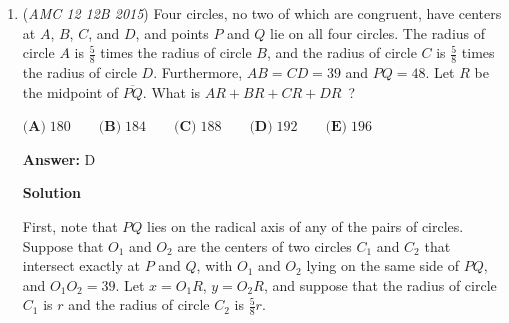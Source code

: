 \begin{enumerate}
 Divide both sides by $2abc$, we have: 
 \[\frac{1}{a}+\frac{1}{b}+\frac{1}{c}=\frac{1}{2}.\]First consider the bound of the variable $a$. Since $\frac{1}{a}<\frac{1}{a}+\frac{1}{b}+\frac{1}{c}=\frac{1}{2},$ we have $a>2$, or $a\ge 3$.

 Also note that $c\ge b\ge a>0$, we have $\frac{1}{a}\ge \frac{1}{b}\ge \frac{1}{c}$. Thus, $\frac{1}{2}=\frac{1}{a}+\frac{1}{b}+\frac{1}{c}\le \frac{3}{a}$, so $a\le 6$.

 So we have $a=3, 4, 5$ or $6$.

 
We can say $\frac{1}{b}+\frac{1}{c}=\frac{1}{q}$, where $\frac{1}{q} = \frac{1}{2}-\frac{1}{a}$.

 Notice $\emph{\text{immediately}}$ that $b, c > q$. This is our key step.Then we can say $b=q+d$, $c=q+e$. If we clear the fraction about b and c (do the math), our immediate result is that $de = q^2$. Realize also that $d \leq e$. 

 Now go through cases for $a$ and you end up with the same result. However, now you don't have to guess solutions. For example, when $a=3$, then $de = 36$ and $d=1, 2, 3, 4, 6$.

 


 


 


	\item (\textit{AMC 12 12B 2015}) Four circles, no two of which are congruent, have centers at $A$, $B$, $C$, and $D$, and points $P$ and $Q$ lie on all four circles. The radius of circle $A$ is $\frac{5}{8}$ times the radius of circle $B$, and the radius of circle $C$ is $\frac{5}{8}$ times the radius of circle $D$. Furthermore, $AB = CD = 39$ and $PQ = 48$. Let $R$ be the midpoint of $\overline{PQ}$. What is $AR+BR+CR+DR$ ?


 $\textbf{(A)}\; 180 \qquad\textbf{(B)}\; 184 \qquad\textbf{(C)}\; 188 \qquad\textbf{(D)}\; 192\qquad\textbf{(E)}\; 196$

 \textbf{Answer: }D



\textbf{Solution}

First, note that $PQ$ lies on the radical axis of any of the pairs of circles. Suppose that $O_1$ and $O_2$ are the centers of two circles $C_1$ and $C_2$ that intersect exactly at $P$ and $Q$, with $O_1$ and $O_2$ lying on the same side of $PQ$, and $O_1 O_2=39$. Let $x=O_1 R$, $y=O_2 R$, and suppose that the radius of circle $C_1$ is $r$ and the radius of circle $C_2$ is $\frac{5}{8}r$.


\end{enumerate}
